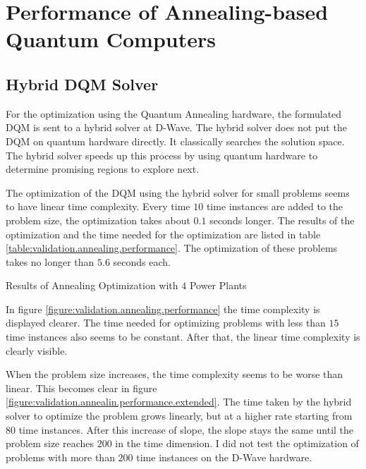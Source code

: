 \section{Performance of Annealing-based Quantum Computers}

\subsection{Hybrid DQM Solver}

For the optimization using the Quantum Annealing hardware, the formulated DQM is sent to a hybrid solver at D-Wave.
The hybrid solver does not put the DQM on quantum hardware directly.
It classically searches the solution space.
The hybrid solver speeds up this process by using quantum hardware to determine promising regions to explore next.
\cite{DQMHybrid2020}

The optimization of the DQM using the hybrid solver for small problems seems to have linear time complexity.
Every time $10$ time instances are added to the problem size, the optimization takes about $0.1$ seconds longer.
The results of the optimization and the time needed for the optimization are listed in table \ref{table:validation.annealing.performance}.
The optimization of these problems takes no longer than $5.6$ seconds each.

\begin{table}[ht]
  \centering
  
  \caption{Results of Annealing Optimization with $4$ Power Plants}
  \label{table:validation.annealing.performance}
\end{table}

In figure \ref{figure:validation.annealing.performance} the time complexity is displayed clearer.
The time needed for optimizing problems with less than $15$ time instances also seems to be constant.
After that, the linear time complexity is clearly visible.

When the problem size increases, the time complexity seems to be worse than linear.
This becomes clear in figure \ref{figure:validation.annealin.performance.extended}.
The time taken by the hybrid solver to optimize the problem grows linearly, but at a higher rate starting from $80$ time instances.
After this increase of slope, the slope stays the same until the problem size reaches $200$ in the time dimension.
I did not test the optimization of problems with more than $200$ time instances on the D-Wave hardware.

